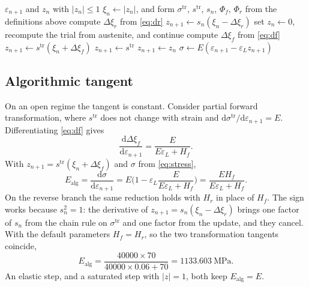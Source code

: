 \documentclass[10pt,a4paper]{article}
\begin{document}
\begin{algorithm}[t]
\caption{Signed-martensite return map. One closed-form step.}
\label{alg:return}
\begin{algorithmic}[1]
\Require $\varepsilon_{n+1}$ and $z_n$ with $|z_n|\le 1$
\State $\xi_n\gets|z_n|$, and form $\sigma^{\mathrm{tr}}$, $s^{\mathrm{tr}}$, $s_n$, $\Phi_f$, $\Phi_r$ from the definitions above
  \State compute $\Delta\xi_r$ from \eqref{eq:dr}
    \State $z_{n+1}\gets s_n(\xi_n-\Delta\xi_r)$
  \Else
    \State set $z_n\gets 0$, recompute the trial from austenite, and continue
  \EndIf
\EndIf
{}
  \State compute $\Delta\xi_f$ from \eqref{eq:df}
    \State $z_{n+1}\gets s^{\mathrm{tr}}(\xi_n+\Delta\xi_f)$
  \Else
    \State $z_{n+1}\gets s^{\mathrm{tr}}$
  \EndIf
\EndIf
{}
  \State $z_{n+1}\gets z_n$
\EndIf
\State $\sigma\gets E(\varepsilon_{n+1}-\varepsilon_L z_{n+1})$
\end{algorithmic}
\end{algorithm}

\subsection{Algorithmic tangent}
\label{sec:tangent}

On an open regime the tangent is constant. Consider partial forward transformation, where $s^{\mathrm{tr}}$ does not change with strain and $\mathrm{d}\sigma^{\mathrm{tr}}/\mathrm{d}\varepsilon_{n+1}=E$. Differentiating \eqref{eq:df} gives
\begin{equation}
  \frac{\mathrm{d}\Delta\xi_f}{\mathrm{d}\varepsilon_{n+1}}
  =\frac{E}{E\varepsilon_L+H_f}.
\end{equation}
With $z_{n+1}=s^{\mathrm{tr}}(\xi_n+\Delta\xi_f)$ and $\sigma$ from \eqref{eq:stress},
\begin{equation}
  \label{eq:tangent}
  E_{\mathrm{alg}}
  =\frac{\mathrm{d}\sigma}{\mathrm{d}\varepsilon_{n+1}}
  =E\Biggl(1-\varepsilon_L\frac{E}{E\varepsilon_L+H_f}\Biggr)
  =\frac{E H_f}{E\varepsilon_L+H_f}.
\end{equation}
On the reverse branch the same reduction holds with $H_r$ in place of $H_f$. The sign works because $s_n^2=1$: the derivative of $z_{n+1}=s_n(\xi_n-\Delta\xi_r)$ brings one factor of $s_n$ from the chain rule on $\sigma^{\mathrm{tr}}$ and one factor from the update, and they cancel. With the default parameters $H_f=H_r$, so the two transformation tangents coincide,
\begin{equation}
  E_{\mathrm{alg}}=\frac{40000\times 70}{40000\times 0.06+70}
  =1133.603~\mathrm{MPa}.
\end{equation}
An elastic step, and a saturated step with $|z|=1$, both keep $E_{\mathrm{alg}}=E$.
\end{document}
